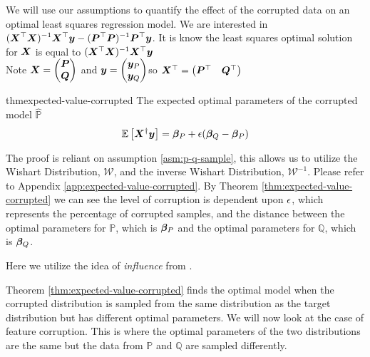 \documentclass{article} %
\begin{document}
	We will use our assumptions to quantify the effect of the corrupted data on an optimal least squares regression model. We are interested in $\displaystyle ({\bm{X}}^\top{\bm{X}})^{-1}{\bm{X}}^\top{\bm{y}} - ({\bm{P}}^\top{\bm{P}})^{-1}{\bm{P}}^\top{\bm{y}}$.
	It is know the least squares optimal solution for ${\bm{X}}$ is equal to $({\bm{X}}^\top{\bm{X}})^{-1}{\bm{X}}^\top{\bm{y}}$\\
	Note $\displaystyle {\bm{X}} = \begin{pmatrix}{\bm{P}} \\ {\bm{Q}} \end{pmatrix}$ and $\displaystyle {\bm{y}} = \begin{pmatrix} {\bm{y}}_P \\ {\bm{y}}_Q \end{pmatrix} $so ${\bm{X}}^\top = \begin{pmatrix}{\bm{P}}^\top & {\bm{Q}}^\top \end{pmatrix}$\\
	
	\begin{restatable}{thm}{expected-value-corrupted}\label{thm:expected-value-corrupted}
		The expected optimal parameters of the corrupted model $\hat{\mathbb{P}}$\vspace{1em}
		\begin{equation}
			\label{eqn:corrupted-optimal}
			\mathbb{E}\left[{\bm{X}}^{\dagger}{\bm{y}} \right] = {\bm{\beta}}_P + {\epsilon}({\bm{\beta}}_Q - {\bm{\beta}}_P)
		\end{equation}
	\end{restatable}
	The proof is reliant on assumption \ref{asm:p-q-sample}, this allows us to utilize the Wishart Distribution, $\mathcal{W}$, and the inverse Wishart Distribution, $\mathcal{W}^{-1}$. Please refer to Appendix \ref{app:expected-value-corrupted}. By Theorem \ref{thm:expected-value-corrupted} we can see the level of corruption is dependent upon ${\epsilon}$, which represents the percentage of corrupted samples, and the distance between the optimal parameters for $\mathbb{P}$, which is ${\bm{\beta}}_P$ and the optimal parameters for $\mathbb{Q}$, which is ${\bm{\beta}}_Q$. 
	
		
	Here we utilize the idea of \textit{influence} from \cite{McWilliams2014}.
	
	Theorem \ref{thm:expected-value-corrupted} finds the optimal model when the corrupted distribution is sampled from the same distribution as the target distribution but has different optimal parameters. We will now look at the case of feature corruption. This is where the optimal parameters of the two distributions are the same but the data from $\mathbb{P}$ and $\mathbb{Q}$ are sampled differently. 
	
\end{document}
